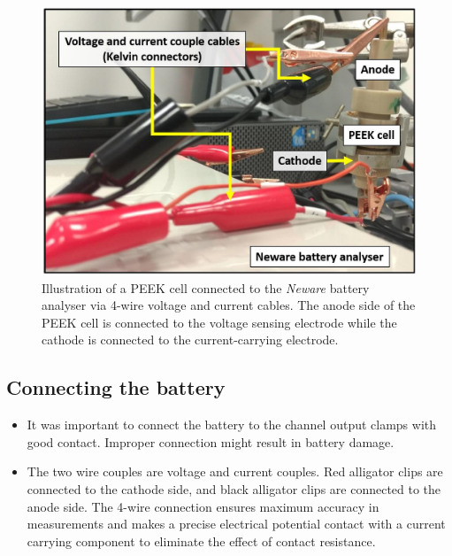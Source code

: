 \begin{figure}[tbh!]
\centering
\includegraphics[width=\textwidth]{Figures/chap3fig/neware.pdf}
\caption{Illustration of a PEEK cell connected to the \textit{Neware} battery analyser via 4-wire voltage and current cables. The anode side of the PEEK cell is connected to the voltage sensing electrode while the cathode is connected to the current-carrying electrode.}
\label{Figures/chap3fig:neware}
\end{figure}

\subsection*{Connecting the battery}
\begin{itemize}
\item It was important to connect the battery to the channel output clamps with good contact. Improper connection might result in battery damage.
\item The two wire couples are voltage and current couples. Red alligator clips are connected to the cathode side, and black alligator clips are connected to the anode side. The 4-wire connection ensures maximum accuracy in measurements and makes a precise electrical potential contact with a current carrying component to eliminate the effect of contact resistance. 
\end{itemize}

